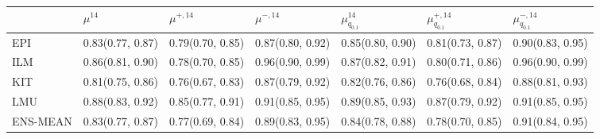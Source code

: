 \begin{tabular}{l p{} p{} p{} p{} p{} p{}}
\toprule
 & $\mu^{14}$ & $\mu^{+, 14}$ & $\mu^{-, 14}$ & $\mu^{14}_{q_{0.1}}$ & $\mu^{+, 14}_{q_{0.1}}$ & $\mu^{-, 14}_{q_{0.1}}$ \\
\midrule
EPI & {0.83\newline(0.77, 0.87)} & {0.79\newline(0.70, 0.85)} & {0.87\newline(0.80, 0.92)} & {0.85\newline(0.80, 0.90)} & {0.81\newline(0.73, 0.87)} & {0.90\newline(0.83, 0.95)} \\
ILM & {0.86\newline(0.81, 0.90)} & {0.78\newline(0.70, 0.85)} & {0.96\newline(0.90, 0.99)} & {0.87\newline(0.82, 0.91)} & {0.80\newline(0.71, 0.86)} & {0.96\newline(0.90, 0.99)} \\
KIT & {0.81\newline(0.75, 0.86)} & {0.76\newline(0.67, 0.83)} & {0.87\newline(0.79, 0.92)} & {0.82\newline(0.76, 0.86)} & {0.76\newline(0.68, 0.84)} & {0.88\newline(0.81, 0.93)} \\
LMU & {0.88\newline(0.83, 0.92)} & {0.85\newline(0.77, 0.91)} & {0.91\newline(0.85, 0.95)} & {0.89\newline(0.85, 0.93)} & {0.87\newline(0.79, 0.92)} & {0.91\newline(0.85, 0.95)} \\
ENS-MEAN & {0.83\newline(0.77, 0.87)} & {0.77\newline(0.69, 0.84)} & {0.89\newline(0.83, 0.95)} & {0.84\newline(0.78, 0.88)} & {0.78\newline(0.70, 0.85)} & {0.91\newline(0.84, 0.95)} \\

\end{tabular}
